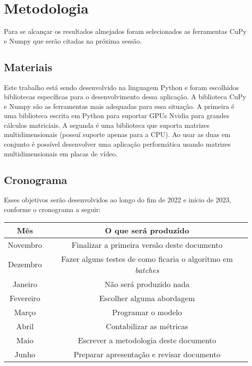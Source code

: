 \section{Metodologia}

Para se alcançar os resultados almejados foram selecionados as ferramentas CuPy e Numpy que serão citadas
na próxima sessão. 

\subsection{Materiais}

Este trabalho está sendo desenvolvido na linguagem Python e foram escolhidos bibliotecas 
específicas para o desenvolvimento dessa aplicação.
A biblioteca CuPy\cite{cupyLib} e Numpy\cite{numpyLib} são as ferramentas mais adequadas
para essa situação. A primeira é uma biblioteca escrita em Python para suportar GPUs Nvidia
para grandes cálculos matriciais. A segunda é uma biblioteca que suporta matrizes multidimensionais
(possuí suporte apenas para a CPU). Ao usar as duas em conjunto é possível desenvolver uma aplicação
performática usando matrizes multidimensionais em placas de vídeo.

\subsection{Cronograma}

Esses objetivos serão desenvolvidos ao longo do fim de 2022 e início de 2023, conforme o 
cronograma a seguir:

\begin{center}
    \begin{tabular}{|c|c|}
        \hline
        Mês & O que será produzido \\
        \hline
        Novembro & Finalizar a primeira versão deste documento \\
        \hline
        Dezembro & Fazer alguns testes de como ficaria o algoritmo em \emph{batches} \\
        \hline
        Janeiro & Não será produzido nada \\
        \hline 
        Fevereiro & Escolher alguma abordagem \\
        \hline
        Março & Programar o modelo \\
        \hline
        Abril & Contabilizar as métricas \\
        \hline
        Maio & Escrever a metodologia deste documento \\
        \hline
        Junho & Preparar apresentação e revisar documento \\
        \hline
    \end{tabular}
\end{center}



